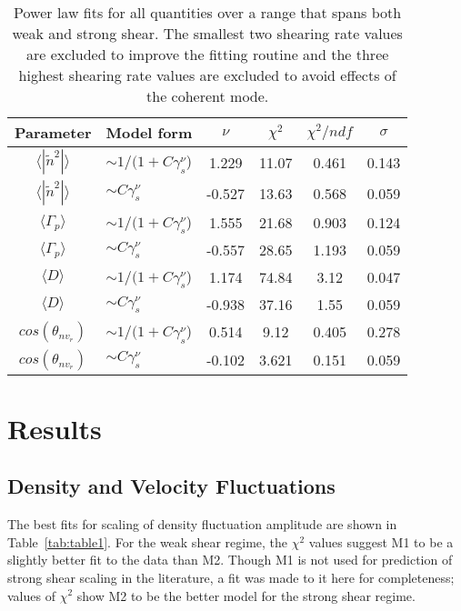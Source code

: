 \documentclass[aip,pop,amsmath,amssymb,preprint,superscriptaddress]{revtex4-1} %
\begin{document}
\begin{table}
\caption{\label{tab:table7}Power law fits for all quantities over a
  range that spans both weak and strong shear. The smallest two
  shearing rate values are excluded to improve the fitting routine and
  the three highest shearing rate values are excluded to avoid effects of the coherent mode.}
\begin{ruledtabular}
\begin{tabular}{clcccc}
Parameter&Model form&$\nu$&$\chi^2$&$\chi^2/ndf$&$\sigma$\\
\hline
$\langle |\tilde{n}^{2}|\rangle$     & $\sim 1/(1+C\gamma_{s}^\nu$) &1.229    &11.07     &0.461   &0.143\\
$\langle |\tilde{n}^{2}|\rangle$     & $\sim C\gamma_{s}^\nu$       &-0.527   &13.63     &0.568   &0.059\\
$\langle \Gamma_{p}\rangle$          & $\sim 1/(1+C\gamma_{s}^\nu$) &1.555    &21.68     &0.903   &0.124\\
$\langle \Gamma_{p}\rangle$          & $\sim C\gamma_{s}^\nu$       &-0.557   &28.65     &1.193   &0.059\\
$\langle D\rangle$                   & $\sim 1/(1+C\gamma_{s}^\nu$) &1.174    &74.84     &3.12    &0.047\\
$\langle D\rangle$                   & $\sim C\gamma_{s}^\nu$       &-0.938   &37.16     &1.55    &0.059\\
$cos(\theta_{nv_{r}})$               & $\sim 1/(1+C\gamma_{s}^\nu$) &0.514    &9.12      &0.405   &0.278\\
$cos(\theta_{nv_{r}})$               & $\sim C\gamma_{s}^\nu$       &-0.102   &3.621     &0.151   &0.059\\

\end{tabular}
\end{ruledtabular}
\end{table}

\section{Results}

\subsection{Density and Velocity Fluctuations}

The best fits for scaling of density fluctuation amplitude are shown in Table~\ref{tab:table1}. For the weak shear regime, the $\chi^{2}$ values suggest M1 to be a slightly better fit to the data than M2. Though M1 is not used for prediction of strong shear scaling in the literature, a fit was made to it here for completeness; values of $\chi^{2}$ show M2 to be the better model for the strong shear regime.
\end{document}
